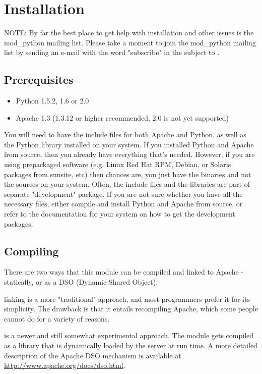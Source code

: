 \chapter{Installation\label{installation}}

NOTE: By far the best place to get help with installation and other
issues is the mod_python mailing list. Please take a moment to join
the mod_python mailing list by sending an e-mail with the word
"subscribe" in the subject to .

\section{Prerequisites\label{inst-prerequisites}}

\begin{itemize}
\item
Python 1.5.2, 1.6 or 2.0
\item
Apache 1.3 (1.3.12 or higher recommended, 2.0 is not yet supported) 
\end{itemize}

You will need to have the include files for both Apache and Python, as
well as the Python library installed on your system.  If you installed
Python and Apache from source, then you already have everything that's
needed. However, if you are using prepackaged software (e.g. Linux Red
Hat RPM, Debian, or Solaris packages from sunsite, etc) then chances
are, you just have the binaries and not the sources on your
system. Often, the include files and the libraries are part of
separate "development" package. If you are not sure whether you have
all the necessary files, either compile and install Python and Apache
from source, or refer to the documentation for your system on how to
get the development packages.

\section{Compiling\label{inst-compiling}}

There are two ways that this module can be compiled and linked to
Apache - statically, or as a DSO (Dynamic Shared Object).

 linking is a more "traditional" approach, and most programmers
prefer it for its simplicity. The drawback is that it entails
recompiling Apache, which some people cannot do for a variety of
reasons. 

 is a newer and still somewhat experimental
approach. The module gets compiled as a library that is dynamically
loaded by the server at run time. A more detailed description of the
Apache DSO mechanism is available at
\url{http://www.apache.org/docs/dso.html}.

